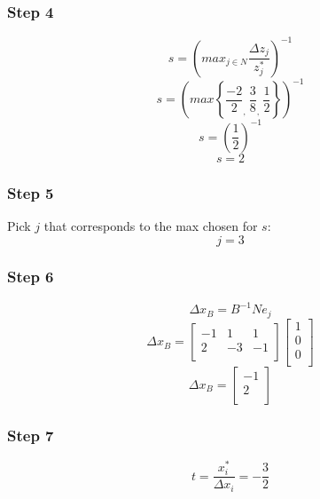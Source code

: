\documentclass[14pt]{extarticle}
\begin{document}
\subsubsection*{Step 4}
\[
    s = \left(max_{j \in N} \frac{\Delta z_j}{z^*_j}\right)^{-1}
\]
\[
    s = \left(max \left\{ \frac{-2}{2}_{\textstyle,}\ \frac{3}{8}_{\textstyle,}\ \frac{1}{2} \right\} \right)^{-1}
\]
\[
    s = \left(\frac{1}{2}\right)^{-1}
\]
\[
    s = 2
\]

\subsubsection*{Step 5}
Pick $j$ that corresponds to the max chosen for $s$:
\[
    j = 3
\]

\subsubsection*{Step 6}
\[
    \Delta x_B = B^{-1}N e_j
\]
\[
    \Delta x_B =
    \begin{bmatrix}
        -1 & 1 & 1 \\
        2 & -3 & -1 \\
    \end{bmatrix}
    \begin{bmatrix}
        1 \\
        0 \\
        0 \\
    \end{bmatrix}
\]
\[
    \Delta x_B =
    \begin{bmatrix}
        -1 \\
        2 \\
    \end{bmatrix}
\]

\subsubsection*{Step 7}
\[
    t = \frac{x^*_i}{\Delta x_i} = -\frac{3}{2}
\]
\end{document}
